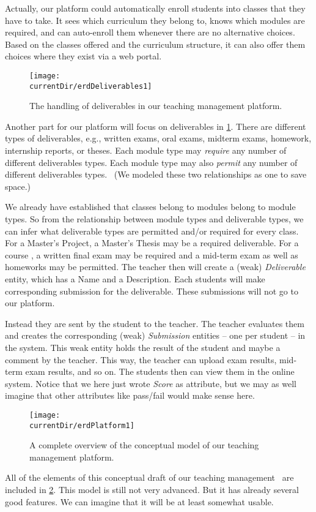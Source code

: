 Actually, our platform could automatically enroll students into classes that they have to take.
It sees which curriculum they belong to, knows which modules are required, and can auto-enroll them whenever there are no alternative choices.
Based on the classes offered and the curriculum structure, it can also offer them choices where they exist via a web portal.

\begin{figure}%
\centering%
\texttt{[image: \\currentDir/erdDeliverables1]}%
\caption{The handling of deliverables in our teaching management platform.}%
\label{fig:erdDeliverables1}%
\end{figure}%
%
Another part for our platform will focus on deliverables in \cref{fig:erdDeliverables1}.
There are different types of deliverables, e.g., written exams, oral exams, midterm exams, homework, internship reports, or theses.
Each module type may \emph{require} any number of different deliverables types.
Each module type may also \emph{permit} any number of different deliverables types.~%
(We modeled these two relationships as one to save space.)

We already have established that classes belong to modules belong to module types.
So from the relationship between module types and deliverable types, we can infer what deliverable types are permitted and/or required for every class.
For a Master's Project, a Master's Thesis may be a required deliverable.
For a course , a written final exam may be required and a mid-term exam as well as homeworks may be permitted.
The teacher then will create a (weak) \emph{Deliverable} entity, which has a Name and a Description.
Each students will make corresponding submission for the deliverable.
These submissions will not go to our platform.

Instead they are sent by the student to the teacher.
The teacher evaluates them and creates the corresponding (weak) \emph{Submission} entities -- one per student -- in the system.
This weak entity holds the result of the student and maybe a comment by the teacher.
This way, the teacher can upload exam results, mid-term exam results, and so on.
The students then can view them in the online system.
Notice that we here just wrote \emph{Score} as attribute, but we may as well imagine that other attributes like pass/fail would make sense here.

\begin{figure}%
\centering%
\texttt{[image: \\currentDir/erdPlatform1]}%
\caption{A complete overview of the conceptual model of our teaching management platform.}%
\label{fig:erdPlatform1}%
\end{figure}%
%
All of the elements of this conceptual draft of our teaching management \db\ are included in \cref{fig:erdPlatform1}.
This model is still not very advanced.
But it has already several good features.
We can imagine that it will be at least somewhat usable.

